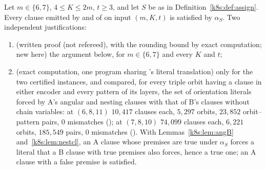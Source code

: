 \begin{proposition}\label{k8s:prop:A}
Let $m\in\{6,7\}$, $4\le K\le2m$, $t\ge3$, and let $S$ be as in Definition~\ref{k8s:def:assign}. Every clause emitted
by  and  of  on input $(m,K,t)$ is satisfied by $\alpha_S$. Two independent
justifications:
\begin{enumerate}[label=(\roman*)]
\item (written proof (not refereed), with the rounding bound by exact computation; new here) the argument below,
for $m\in\{6,7\}$ and every $K$ and $t$;
\item (exact computation, one program sharing 's literal translation) only for the two certified instances,
 and  compared, for every triple orbit having a clause
in either encoder and every pattern of its layers, the set of orientation literals forced by A's angular and nesting
clauses with that of B's clauses without chain variables: at $(6,8,11)$ $10{,}417$ clauses each, $5{,}297$ orbits,
$23{,}852$ orbit--pattern pairs, $0$ mismatches (); at $(7,8,10)$ $74{,}099$
clauses each, $6{,}221$ orbits, $185{,}549$ pairs, $0$ mismatches (). With
Lemmas~\ref{k8s:lem:angB} and~\ref{k8s:lem:nestcl}, an A clause whose premises are true under $\alpha_S$ forces a literal
that a B clause with true premises also forces, hence a true one; an A clause with a false premise is satisfied.
\end{enumerate}
\end{proposition}

